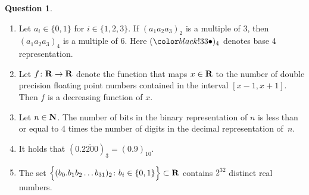 \documentclass[11pt]{article}
\theoremstyle{definition}
\newtheorem{question}{Question}
\begin{document}
\begin{question}
\begin{enumerate}
        \item
            Let $a_i \in \{0, 1\}$ for $i \in \{1, 2, 3\}$.
            If $(a_1 a_2 a_3)_2$ is a multiple of 3,
            then $(a_1 a_2 a_3)_4$ is a multiple of 6.
            Here $(\placeholder)_4$ denotes base 4 representation.

        \item
            Let $f\colon \mathbf R \to \mathbf R$ denote the function that maps $x \in \mathbf R$
            to the number of double precision floating point numbers contained in the interval $[x-1, x+1]$.
            Then $f$ is a decreasing function of $x$.

        \item
            Let $n \in \mathbf N$.
            The number of bits in the binary representation of $n$ is less than or equal to 4 times the number of digits in the decimal representation of~$n$.

        \item
            It holds that $(0.\overline{2200})_3 = (0.9)_{10}$.

        \item
            The set
            \(
                \Bigl\{ (b_0. b_1 b_2 \dots b_{31})_2 \colon b_i \in \{0, 1\} \Bigr\} \subset \mathbf R
            \)
            contains $2^{32}$ distinct real numbers.
    \end{enumerate}
\end{question}
\end{document}
